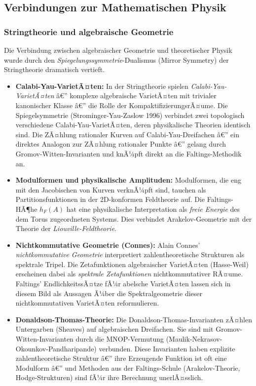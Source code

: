 ﻿\documentclass[12pt,a4paper]{article}
\theoremstyle{plain}
\theoremstyle{definition}
\theoremstyle{remark}
\begin{document}
\subsection{Verbindungen zur Mathematischen Physik}

\subsubsection{Stringtheorie und algebraische Geometrie}

Die Verbindung zwischen algebraischer Geometrie und theoretischer Physik wurde durch
den \emph{Spiegelungssymmetrie}-Dualismus (Mirror Symmetry) der Stringtheorie
dramatisch vertieft.

\begin{itemize}[leftmargin=2em,itemsep=4pt]
  \item \textbf{Calabi-Yau-VarietÃ¤ten:}
    In der Stringtheorie spielen \emph{Calabi-Yau-VarietÃ¤ten} â€” komplexe algebraische
    VarietÃ¤ten mit trivialer kanonischer Klasse â€” die Rolle der KompaktifizierungsrÃ¤ume.
    Die Spiegelsymmetrie (Strominger-Yau-Zaslow 1996) verbindet zwei topologisch
    verschiedene Calabi-Yau-VarietÃ¤ten, deren physikalische Theorien identisch sind.
    Die ZÃ¤hlung rationaler Kurven auf Calabi-Yau-Dreifachen â€” ein direktes Analogon
    zur ZÃ¤hlung rationaler Punkte â€” gelang durch Gromov-Witten-Invarianten und
    knÃ¼pft direkt an die Faltings-Methodik an.

  \item \textbf{Modulformen und physikalische Amplituden:}
    Modulformen, die eng mit den Jacobischen von Kurven verknÃ¼pft sind, tauchen
    als Partitionsfunktionen in der 2D-konformen Feldtheorie auf. Die Faltings-HÃ¶he
    $h_F(A)$ hat eine physikalische Interpretation als \emph{freie Energie} des
    dem Torus zugeordneten Systems. Dies verbindet Arakelov-Geometrie mit
    der Theorie der \emph{Liouville-Feldtheorie}.

  \item \textbf{Nichtkommutative Geometrie (Connes):}
    Alain Connes' \emph{nichtkommutative Geometrie} interpretiert zahlentheoretische
    Strukturen als spektrale Tripel. Die Zetafunktionen algebraischer VarietÃ¤ten
    (Hasse-Weil) erscheinen dabei als \emph{spektrale Zetafunktionen} nichtkommutativer
    RÃ¤ume. Faltings' EndlichkeitssÃ¤tze fÃ¼r abelsche VarietÃ¤ten lassen sich in diesem
    Bild als Aussagen Ã¼ber die Spektralgeometrie dieser nichtkommutativen VarietÃ¤ten
    reformulieren.

  \item \textbf{Donaldson-Thomas-Theorie:}
    Die Donaldson-Thomas-Invarianten zÃ¤hlen Untergarben (Sheaves) auf algebraischen
    Dreifachen. Sie sind mit Gromov-Witten-Invarianten durch die MNOP-Vermutung
    (Maulik-Nekrasov-Okounkov-Pandharipande) verbunden. Diese Invarianten haben
    explizite zahlentheoretische Struktur â€” ihre Erzeugende Funktion ist oft eine
    Modulform â€” und Methoden aus der Faltings-Schule (Arakelov-Theorie, Hodge-Strukturen)
    sind fÃ¼r ihre Berechnung unerlÃ¤sslich.
\end{itemize}
\end{document}
